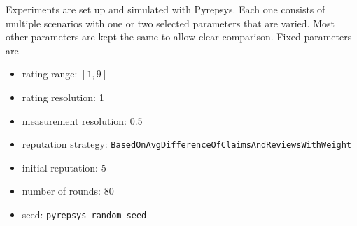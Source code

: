 \documentclass[%
    ]{\PathToTumTemplate/thesis/tum_thesis}
\begin{document}
Experiments are set up and simulated with Pyrepsys.
Each one consists of multiple scenarios with one or two selected parameters that are varied.
Most other parameters are kept the same to allow clear comparison.
Fixed parameters are
\begin{itemize}
	\item rating range: $[1,9]$
	\item rating resolution: 1
	\item measurement resolution: 0.5
	\item reputation strategy: \lstinline{BasedOnAvgDifferenceOfClaimsAndReviewsWithWeight}
	\item initial reputation: 5
	\item number of rounds: 80
	\item seed: \lstinline{pyrepsys_random_seed}
\end{itemize}
\end{document}
